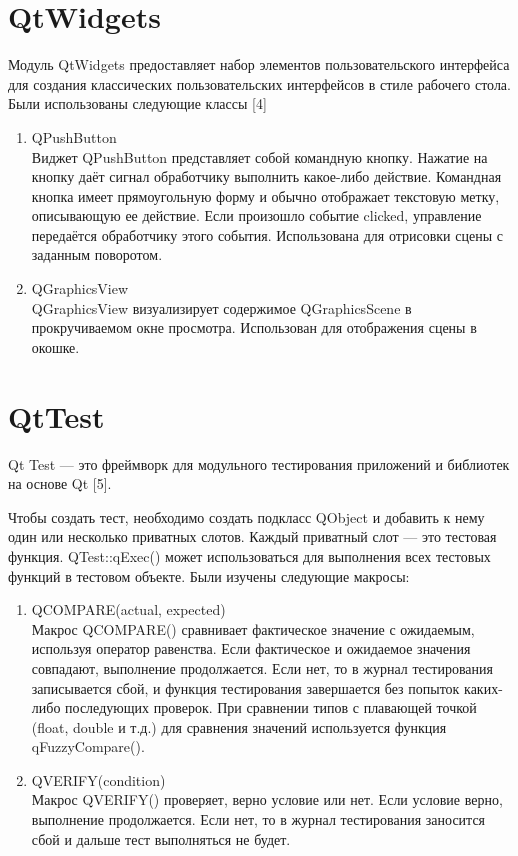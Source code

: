 \documentclass[a4paper,14pt]{extreport}
\begin{document}
		\section{QtWidgets}
		Модуль QtWidgets предоставляет набор элементов пользовательского 
интерфейса для создания классических пользовательских интерфейсов в стиле 
рабочего стола. Были использованы следующие классы [4]
		\begin{enumerate} 
        			\item QPushButton \\
Виджет QPushButton представляет собой командную кнопку. Нажатие 
на кнопку даёт сигнал обработчику выполнить какое-либо действие. 
Командная кнопка имеет прямоугольную форму и обычно отображает 
текстовую метку, описывающую ее действие. Если произошло событие 
clicked, управление передаётся обработчику этого события. 
Использована для отрисовки сцены с заданным поворотом.
			\item QGraphicsView \\
			QGraphicsView визуализирует содержимое QGraphicsScene в 
прокручиваемом окне просмотра. Использован для отображения сцены 
в окошке.
    		\end{enumerate} 
		
		\section{QtTest}
		Qt Test — это фреймворк для модульного тестирования приложений и 
библиотек на основе Qt [5].
		\par Чтобы создать тест, необходимо создать подкласс QObject и добавить к 
нему один или несколько приватных слотов. Каждый приватный слот — это 
тестовая функция. QTest::qExec() может использоваться для выполнения всех 
тестовых функций в тестовом объекте. Были изучены следующие макросы:
		\begin{enumerate} 
        			\item QCOMPARE(actual, expected)\\
			Макрос QCOMPARE() сравнивает фактическое значение с ожидаемым, 
используя оператор равенства. Если фактическое и ожидаемое
значения совпадают, выполнение продолжается. Если нет, то в журнал 
тестирования записывается сбой, и функция тестирования завершается
без попыток каких-либо последующих проверок. При сравнении типов 
с плавающей точкой (float, double и т.д.) для сравнения значений
используется функция qFuzzyCompare().
			\item QVERIFY(condition) \\
			Макрос QVERIFY() проверяет, верно условие или нет. Если условие 
верно, выполнение продолжается. Если нет, то в журнал тестирования 
заносится сбой и дальше тест выполняться не будет.
    		\end{enumerate} 
\end{document}
